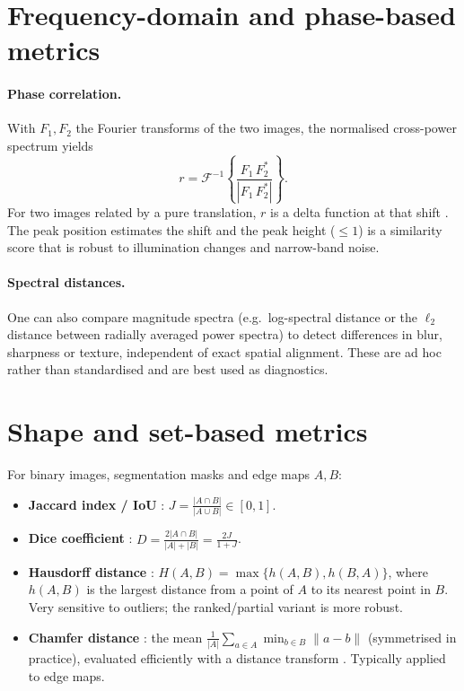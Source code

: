 \section{Frequency-domain and phase-based metrics}

\paragraph{Phase correlation.} With $F_1,F_2$ the Fourier transforms of the two images, the normalised cross-power spectrum yields
\[
r=\mathcal F^{-1}\!\left\{\frac{F_1\,F_2^{*}}{|F_1\,F_2^{*}|}\right\}.
\]
For two images related by a pure translation, $r$ is a delta function at that shift \citep{kuglin1975}. The peak position estimates the shift and the peak height ($\le 1$) is a similarity score that is robust to illumination changes and narrow-band noise.

\paragraph{Spectral distances.} One can also compare magnitude spectra (e.g.\ log-spectral distance or the $\ell_2$ distance between radially averaged power spectra) to detect differences in blur, sharpness or texture, independent of exact spatial alignment. These are ad hoc rather than standardised and are best used as diagnostics.

\section{Shape and set-based metrics}

For binary images, segmentation masks and edge maps $A,B$:

\begin{itemize}
  \item \textbf{Jaccard index / IoU} \citep{jaccard1912}: $J=\frac{|A\cap B|}{|A\cup B|}\in[0,1]$.
  \item \textbf{Dice coefficient} \citep{dice1945}: $D=\frac{2|A\cap B|}{|A|+|B|}=\frac{2J}{1+J}$.
  \item \textbf{Hausdorff distance} \citep{huttenlocher1993}: $H(A,B)=\max\{h(A,B),h(B,A)\}$, where $h(A,B)$ is the largest distance from a point of $A$ to its nearest point in $B$. Very sensitive to outliers; the ranked/partial variant is more robust.
  \item \textbf{Chamfer distance} \citep{barrow1977}: the mean $\frac1{|A|}\sum_{a\in A}\min_{b\in B}\|a-b\|$ (symmetrised in practice), evaluated efficiently with a distance transform \citep{borgefors1986}. Typically applied to edge maps.
\end{itemize}

